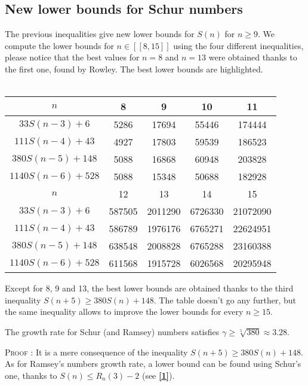 \subsection{New lower bounds for Schur numbers}

The previous inequalities give new lower bounds for \(S(n)\) for
\( n \geqslant 9 \). We compute the lower
bounds for \( n \in [\![8,15]\!] \) using the four different inequalities, please notice that the best values for \( n =
8\) and \(n = 13\) were obtained thanks to the first one, found by Rowley. The best lower bounds are highlighted.\\
\\
\begin{center}
\begin{tabular}{|*{5}{c|}}
    \hline
	\(n\) & 8 & 9 & 10 & 11 \\
	\hline
	\(33S(n-3) + 6 \) & \cellcolor{yellow} 5286 & 17694 & 55446 & 174444\\
	\hline
	\(111S(n-4) + 43 \) & 4927 & \cellcolor{yellow} 17803 & 59539 & 186523\\
	\hline
	\(380S(n-5) + 148 \) & 5088 & 16868 & \cellcolor{yellow} 60948 & \cellcolor{yellow} 203828 \\
	\hline
	\(1140S(n-6) + 528 \) & 5088 & 15348 & 50688 & 182928\\
	\hline
	\hline
	\(n\) & 12 & 13 & 14 & 15 \\
	\hline
	\(33S(n-3) + 6 \) & 587505 & \cellcolor{yellow} 2011290 & 6726330 & 21072090\\
	\hline
	\(111S(n-4) + 43 \) & 586789 & 1976176 & 6765271 & 22624951 \\
	\hline
\(380S(n-5) + 148 \) & \cellcolor{yellow} 638548 & 2008828 & \cellcolor{yellow} 6765288 & \cellcolor{yellow} 23160388 \\	\hline
	\(1140S(n-6) + 528 \) & 611568 & 1915728 & 6026568 & 20295948 \\
	\hline
\end{tabular}
\end{center}
Except for 8, 9 and 13, the best lower bounds are obtained thanks to
the third inequality \( S(n+5) \geqslant 380S(n) + 148\). The table
doesn't go any further, but the same inequality allows to improve the
lower bounds for every \( n \geqslant 15 \).

\begin{corollary}
The growth rate for Schur (and Ramsey) numbers satisfies \(\gamma \geqslant \sqrt[5]{380} \approx 3.28 \).
\end{corollary}
\textsc{Proof :} It is a mere consequence of the inequality \( S(n+5) \geqslant 380S(n) + 148\). As for Ramsey's
numbers growth rate, a lower bound can be found using Schur's one, thanks to \(S(n) \leqslant R_n(3)-2 \)
(see \hyperlink{label1}{\textbf{[1]}}).
